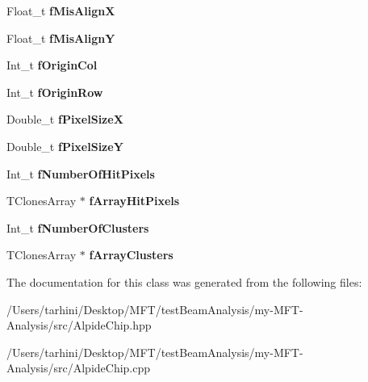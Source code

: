 \begin{DoxyCompactItemize}
Float\+\_\+t {\bfseries f\+Mis\+AlignX}
\item 
\mbox{\label{class_alpide_chip_ac0d77515f4546759efeb8a9a139664b4}} 
Float\+\_\+t {\bfseries f\+Mis\+AlignY}
\item 
\mbox{\label{class_alpide_chip_ab92d8630c0056a1ab5b9cce78ec872e2}} 
Int\+\_\+t {\bfseries f\+Origin\+Col}
\item 
\mbox{\label{class_alpide_chip_a258d547d2e5d3323be237577d5d9b714}} 
Int\+\_\+t {\bfseries f\+Origin\+Row}
\item 
\mbox{\label{class_alpide_chip_a80cb51a5a2779d04fb9edcada89f8351}} 
Double\+\_\+t {\bfseries f\+Pixel\+SizeX}
\item 
\mbox{\label{class_alpide_chip_a60a7359c897973e1bb7b6a51311789fe}} 
Double\+\_\+t {\bfseries f\+Pixel\+SizeY}
\item 
\mbox{\label{class_alpide_chip_ae22a1320224247feac437e9351b0f6d3}} 
Int\+\_\+t {\bfseries f\+Number\+Of\+Hit\+Pixels}
\item 
\mbox{\label{class_alpide_chip_a4c5e70de283159303935b92fec1b6635}} 
T\+Clones\+Array $\ast$ {\bfseries f\+Array\+Hit\+Pixels}
\item 
\mbox{\label{class_alpide_chip_a0fc4b7bcc6be9bad820417d35852c92c}} 
Int\+\_\+t {\bfseries f\+Number\+Of\+Clusters}
\item 
\mbox{\label{class_alpide_chip_abee2713286d7237e8033df54181f3bfb}} 
T\+Clones\+Array $\ast$ {\bfseries f\+Array\+Clusters}
\end{DoxyCompactItemize}


The documentation for this class was generated from the following files\+:\begin{DoxyCompactItemize}
\item 
/\+Users/tarhini/\+Desktop/\+M\+F\+T/test\+Beam\+Analysis/my-\/\+M\+F\+T-\/\+Analysis/src/Alpide\+Chip.\+hpp\item 
/\+Users/tarhini/\+Desktop/\+M\+F\+T/test\+Beam\+Analysis/my-\/\+M\+F\+T-\/\+Analysis/src/Alpide\+Chip.\+cpp\end{DoxyCompactItemize}
